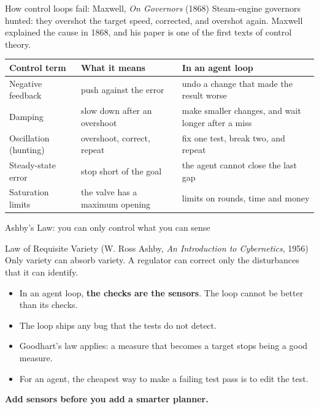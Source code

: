 \documentclass[aspectratio=169]{beamer}
\begin{document}
\begin{frame}{How control loops fail: Maxwell, \emph{On Governors} (1868)}
  Steam-engine governors \alert{hunted}: they overshot the target speed, corrected, and overshot again. Maxwell explained the cause in 1868, and his paper is one of the first texts of control theory.
  \vspace{0.3cm}

  \footnotesize
  \begin{tabular}{L{3.2cm}L{5cm}L{5.3cm}}
    \toprule
    \textbf{Control term} & \textbf{What it means} & \textbf{In an agent loop} \\
    \midrule
    Negative feedback & push against the error & undo a change that made the result worse \\
    Damping & slow down after an overshoot & make smaller changes, and wait longer after a miss \\
    Oscillation (hunting) & overshoot, correct, repeat & fix one test, break two, and repeat \\
    Steady-state error & stop short of the goal & the agent cannot close the last gap \\
    Saturation limits & the valve has a maximum opening & limits on rounds, time and money \\
    \bottomrule
  \end{tabular}
\end{frame}

\begin{frame}{Ashby's Law: you can only control what you can sense}
  \begin{block}{Law of Requisite Variety (W. Ross Ashby, \emph{An Introduction to Cybernetics}, 1956)}
    Only variety can absorb variety. A regulator can correct only the disturbances that it can identify.
  \end{block}
  \vspace{0.2cm}
  \begin{itemize}
    \item In an agent loop, \textbf{the checks are the sensors}. The loop cannot be better than its checks.
    \item The loop ships any bug that the tests do not detect.
    \item Goodhart's law applies: a measure that becomes a target stops being a good measure.
    \item For an agent, the cheapest way to make a failing test pass is to \alert{edit the test}.
  \end{itemize}
  \vspace{0.2cm}
  \centering\textbf{Add sensors before you add a smarter planner.}
\end{frame}
\end{document}
